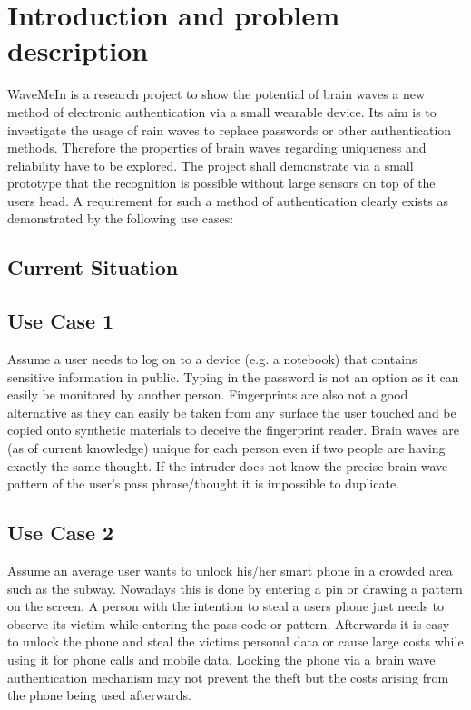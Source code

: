 \documentclass[a4paper,11pt]{article}
\begin{document}
\section{Introduction and problem description}
\label{sect:intro}
WaveMeIn is a research project to show the potential of brain waves a new method of electronic authentication via a small wearable device. Its aim is to investigate the usage of rain waves to replace passwords or other authentication methods. Therefore the properties of brain waves regarding uniqueness and reliability have to be explored. The project shall demonstrate via a small prototype that the recognition is possible without large sensors on top of the users head. A requirement for such a method of authentication clearly exists as demonstrated by the following use cases:

\subsection{Current Situation}


\subsection{Use Case 1}{
Assume a user needs to log on to a device (e.g. a notebook) that contains sensitive information in public. Typing in the password is not an option as it can easily be monitored by another person. Fingerprints are also not a good alternative as they can easily be taken from any surface the user touched and be copied onto synthetic materials to deceive the fingerprint reader. Brain waves are (as of current knowledge) unique for each person even if two people are having exactly the same thought. If the intruder does not know the precise brain wave pattern of the user's pass phrase/thought it is impossible to duplicate.}

\subsection{Use Case 2}{
Assume an average user wants to unlock his/her smart phone in a crowded area such as the subway. Nowadays this is done by entering a pin or drawing a pattern on the screen. A person with the intention to steal a users phone just needs to observe its victim while entering the pass code or pattern. Afterwards it is easy to unlock the phone and steal the victims personal data or cause large costs while using it for phone calls and mobile data. Locking the phone via a brain wave authentication mechanism may not prevent the theft but the costs arising from the phone being used afterwards.}
\end{document}
